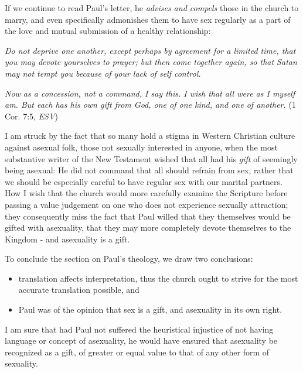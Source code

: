 \documentclass[12pt]{article}
\begin{document}
    \par If we continue to read Paul's letter, he \textit{advises and compels}
        those in the church to marry, and even specifically admonishes them
        to have sex regularly as a part of the love and mutual submission
        of a healthy relationship:
        \par \textit{Do not deprive one another, except perhaps by agreement
        for a limited time, that you may devote yourselves to prayer; but
        then come together again, so that Satan may not tempt you because
        of your lack of self control.} 
        \par \textit{Now as a concession, not a command, I say this.
        I wish that all were as I myself am. But each has his own
        gift from God, one of one kind, and one of another.}
        (1 Cor. 7:5, \textit{ESV}\cite{esv2016}) \\
        \par I am struck by the fact that so many hold a stigma in Western
        Christian culture against asexual folk, those not sexually
        interested in anyone, when the most substantive writer of the 
        New Testament wished that all had his \textit{gift} of seemingly
        being asexual: He did not command that all should refrain from sex,
        rather that we should be especially careful to have regular sex with
        our marital partners. How I wish that the church would more
        carefully examine the Scripture before passing a value judgement
        on one who does not experience sexually attraction; they
        consequently miss the fact that Paul willed that they themselves
        would be gifted with asexuality, that they may more completely
        devote themselves to the Kingdom - and asexuality is a gift. \\

    \singlespace
    \par To conclude the section on Paul's theology, we draw two conclusions:
        \begin{itemize}
            \item{translation affects interpretation, thus the church ought
                to strive for the most accurate translation possible, and}
            \item{Paul was of the opinion that sex is a gift, and
                asexuality in its own right.}
        \end{itemize}
        \doublespace
        I am sure that had Paul not suffered the heuristical injustice of not
        having language or concept of asexuality, he would have ensured that
        asexuality be recognized as a gift, of greater or equal value to
        that of any other form of sexuality.
\end{document}
